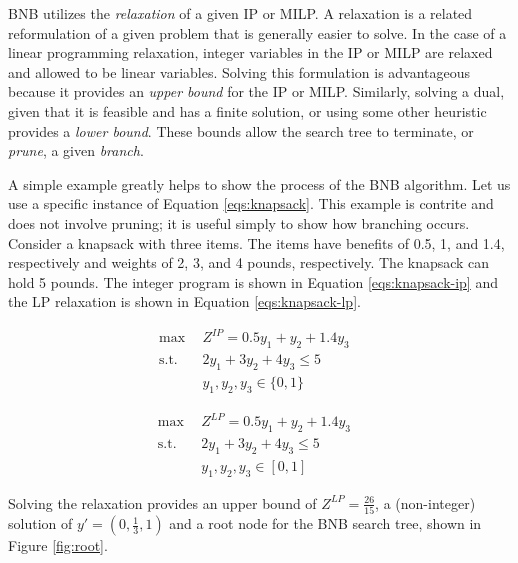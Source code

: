 BNB utilizes the \textit{relaxation} of a given IP or MILP. A relaxation is a
related reformulation of a given problem that is generally easier to solve. In
the case of a linear programming relaxation, integer variables in the IP or MILP
are relaxed and allowed to be linear variables. Solving this formulation is
advantageous because it provides an \textit{upper bound} for the IP or
MILP. Similarly, solving a dual, given that it is feasible and has a finite
solution, or using some other heuristic provides a \textit{lower bound}. These
bounds allow the search tree to terminate, or \textit{prune}, a
given \textit{branch}.

A simple example greatly helps to show the process of the BNB algorithm. Let us
use a specific instance of Equation \ref{eqs:knapsack}. This example is
contrite and does not involve pruning; it is useful simply to show how
branching occurs. Consider a knapsack with three items. The items have benefits
of 0.5, 1, and 1.4, respectively and weights of 2, 3, and 4 pounds,
respectively. The knapsack can hold 5 pounds. The integer program is shown in
Equation \ref{eqs:knapsack-ip} and the LP relaxation is shown in
Equation \ref{eqs:knapsack-lp}.

\begin{subequations}\label{eqs:knapsack-ip}
  \begin{align}
    \max \:\: & 
    Z^{IP} = 0.5 y_1 + y_2 + 1.4 y_3
    & \\
    \text{s.t.} \:\: &
    2y_1 + 3y_2 + 4y_3 \leq 5 
    & \\
    &
    y_1, y_2, y_3 \in \{ 0, 1 \}
  \end{align}
\end{subequations}

\begin{subequations}\label{eqs:knapsack-lp}
  \begin{align}
    \max \:\: & 
    Z^{LP} = 0.5 y_1 + y_2 + 1.4 y_3
    & \\
    \text{s.t.} \:\: &
    2y_1 + 3y_2 + 4y_3 \leq 5 
    & \\
    &
    y_1, y_2, y_3 \in [0, 1]
  \end{align}
\end{subequations}

Solving the relaxation provides an upper bound of $Z^{LP} = \frac{26}{15}$, a
(non-integer) solution of $y' = (0, \frac{1}{3}, 1)$ and a root node for the BNB
search tree, shown in Figure \ref{fig:root}.

